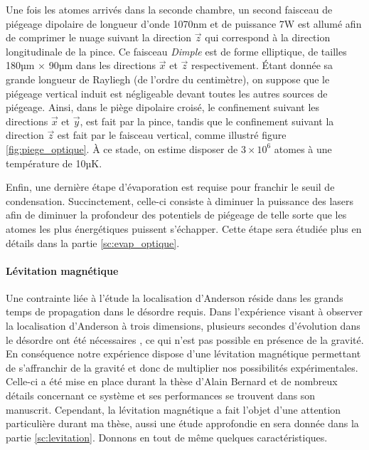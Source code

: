 Une fois les atomes arrivés dans la seconde chambre, un second faisceau de piégeage dipolaire de longueur d'onde 1070nm et de puissance 7W est allumé afin de comprimer le nuage suivant la direction $\vec{z}$ qui correspond à la direction longitudinale de la pince. Ce faisceau \emph{Dimple} est de forme elliptique, de tailles 180µm $\times$ 90µm dans les directions $\vec{x}$ et $\vec{z}$ respectivement. Étant donnée sa grande longueur de Rayliegh (de l'ordre du centimètre), on suppose que le piégeage vertical induit est négligeable devant toutes les autres sources de piégeage. Ainsi, dans le piège dipolaire croisé, le confinement suivant les directions $\vec{x}$ et $\vec{y}$, est fait par la pince, tandis que le confinement suivant la direction $\vec{z}$ est fait par le faisceau vertical, comme illustré figure \ref{fig:piege_optique}. À ce stade, on estime disposer de $3 \times 10^6$ atomes à une température de 10µK.

Enfin, une dernière étape d'évaporation est requise pour franchir le seuil de condensation. Succinctement, celle-ci consiste à diminuer la puissance des lasers afin de diminuer la profondeur des potentiels de piégeage de telle sorte que les atomes les plus énergétiques puissent s'échapper. Cette étape sera étudiée plus en détails dans la partie \ref{sc:evap_optique}.



\paragraph*{Lévitation magnétique}
Une contrainte liée à l'étude la localisation d'Anderson réside dans les grands temps de propagation dans le désordre requis. Dans l'expérience visant à observer la localisation d'Anderson à trois dimensions, plusieurs secondes d'évolution dans le désordre ont été nécessaires \citep{jendrzejewski2012three}, ce qui n'est pas possible en présence de la gravité. En conséquence notre expérience dispose d'une lévitation magnétique permettant de s'affranchir de la gravité et donc de multiplier nos possibilités expérimentales. Celle-ci a été mise en place durant la thèse d'Alain Bernard et de nombreux détails concernant ce système et ses performances se trouvent dans son manuscrit. Cependant, la lévitation magnétique a fait l'objet d'une attention particulière durant ma thèse, aussi une étude approfondie en sera donnée dans la partie \ref{sc:levitation}. Donnons en tout de même quelques caractéristiques.

